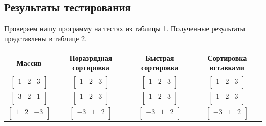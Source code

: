 \documentclass[a4paper,14pt]{article} %
\begin{document}
	
	        
        \subsection{Результаты тестирования}
        
         Проверяем нашу программу на тестах из таблицы 1. Полученные результаты представлены в таблице 2. 
	\begin{center}
		\begin{tabular}{  | c | c | c | c |}
			\hline
			\textbf{Маcсив}& \textbf{Поразрядная сортировка} & \textbf{Быстрая сортировка} & \textbf{Сортировка вставками} \\ \hline
			$\begin{bmatrix} 
   			1&2&3 \\
			\end{bmatrix}$ & 
			$\begin{bmatrix} 
   			1&2&3 \\
			\end{bmatrix}$ 
			& 
			$\begin{bmatrix} 
   			1&2&3 \\
			\end{bmatrix}$
			& 
			$\begin{bmatrix} 
   			1&2&3 \\
			\end{bmatrix}$ \\
			\hline
			
			$\begin{bmatrix} 
   			3&2&1 \\
			\end{bmatrix}$ & 
			$\begin{bmatrix} 
   			1&2&3 \\
			\end{bmatrix}$ & 
			$\begin{bmatrix} 
   			1&2&3 \\
			\end{bmatrix}$ & 
			$\begin{bmatrix} 
   			1&2&3 \\
			\end{bmatrix}$ \\
			\hline
			
			$\begin{bmatrix} 
   			1&2&-3 \\
			\end{bmatrix}$ & 
			$\begin{bmatrix} 
   			-3&1&2 \\
			\end{bmatrix}$ & 
			$\begin{bmatrix} 
   			-3&1&2 \\
			\end{bmatrix}$ & 
			$\begin{bmatrix} 
   			-3&1&2 \\
			\end{bmatrix}$ \\
			\hline
			

\end{tabular}
\end{center}
\end{document}
